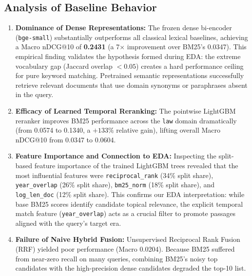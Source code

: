 \subsection{Analysis of Baseline Behavior}
\begin{enumerate}
    \item \textbf{Dominance of Dense Representations:} The frozen dense bi-encoder (\texttt{bge-small}) substantially outperforms all classical lexical baselines, achieving a Macro nDCG@10 of \textbf{0.2431} (a 7$\times$ improvement over BM25's 0.0347). This empirical finding validates the hypothesis formed during EDA: the extreme vocabulary gap (Jaccard overlap $<0.05$) creates a hard performance ceiling for pure keyword matching. Pretrained semantic representations successfully retrieve relevant documents that use domain synonyms or paraphrases absent in the query.
    \item \textbf{Efficacy of Learned Temporal Reranking:} The pointwise LightGBM reranker improves BM25 performance across the \texttt{law} domain dramatically (from 0.0574 to 0.1340, a $+133\%$ relative gain), lifting overall Macro nDCG@10 from 0.0347 to 0.0604. 
    \item \textbf{Feature Importance and Connection to EDA:} Inspecting the split-based feature importance of the trained LightGBM trees revealed that the most influential features were \texttt{reciprocal\_rank} (34\% split share), \texttt{year\_overlap} (26\% split share), \texttt{bm25\_norm} (18\% split share), and \texttt{log\_len\_doc} (12\% split share). This confirms our EDA interpretation: while base BM25 scores identify candidate topical relevance, the explicit temporal match feature (\texttt{year\_overlap}) acts as a crucial filter to promote passages aligned with the query's target era.
    \item \textbf{Failure of Naive Hybrid Fusion:} Unsupervised Reciprocal Rank Fusion (RRF) yielded poor performance (Macro 0.0204). Because BM25 suffered from near-zero recall on many queries, combining BM25's noisy top candidates with the high-precision dense candidates degraded the top-10 list.
\end{enumerate}
